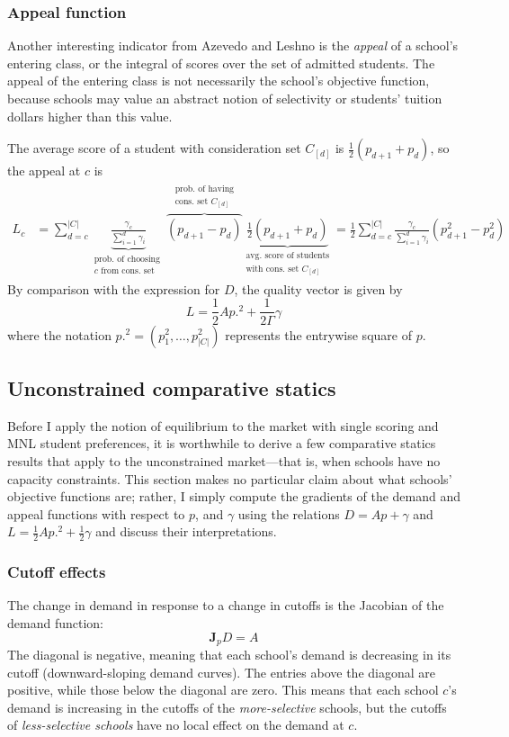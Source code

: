 \documentclass[12pt]{article}
\theoremstyle{definition}
\begin{document}
\subsubsection{Appeal function}
Another interesting indicator from Azevedo and Leshno \parencite*{supplydemandfw} is the \emph{appeal} of a school's entering class, or the integral of scores over the set of admitted students. The appeal of the entering class is not necessarily the school's objective function, because schools may value an abstract notion of selectivity or students' tuition dollars higher than this value. 

The average score of a student with consideration set $C_{[d]}$ is $\frac{1}{2}\left(p_{d+1} + p_d\right)$, so the appeal at $c$ is
\begin{align}
L_c &= \sum_{d=c}^{|C|} 
\underbrace{\frac{{\gamma_c}}{ \sum_{i=1}^d {\gamma_i}}}_{\substack{\text{prob. of choosing  }\\ c\text{ from cons. set}}} 
\overbrace{\left(p_{d+1} - p_{d}\right)}^{\substack{\text{prob. of having}\\ \text{cons. set }C_{[d]}}} 
\underbrace{\frac{1}{2}\left(p_{d+1} + p_{d}\right)}_{\substack{\text{avg. score of students}\\ \text{with cons. set }C_{[d]}}}
=\frac{1}{2}\sum_{d=c}^{|C|} 
\frac{{\gamma_c}}{ \sum_{i=1}^d {\gamma_i}} 
\left(p_{d+1}^2 -  p_{d}^2\right)
\end{align}
By comparison with the expression for $D$, the quality vector is given by 
\[L = \frac{1}{2} A p.^2 + \frac{1}{2\Gamma} \gamma\]
where the notation $p.^2 = (p_1^2, \dots, p_{|C|}^2)$ represents the entrywise square of $p$.

\subsection{Unconstrained comparative statics}
Before I apply the notion of equilibrium to the market with single scoring and MNL student preferences, it is worthwhile to derive a few comparative statics results that apply to the unconstrained market---that is, when schools have no capacity constraints. This section makes no particular claim about what schools' objective functions are; rather, I simply compute the gradients of the demand and appeal functions with respect to $p$, and $\gamma$ using the relations $D = Ap + \gamma$ and $L = \frac{1}{2} A p.^2 + \frac{1}{2}\gamma$ and discuss their interpretations.

\subsubsection{Cutoff effects}
The change in demand in response to a change in cutoffs is the Jacobian of the demand function:
\[\mathbf{J}_p D = A \]
The diagonal is negative, meaning that each school's demand is decreasing in its cutoff (downward-sloping demand curves). The entries above the diagonal are positive, while those below the diagonal are zero. This means that each school $c$'s demand is increasing in the cutoffs of the \emph{more-selective} schools, but the cutoffs of \emph{less-selective schools} have no local effect on the demand at $c$.
\end{document}
